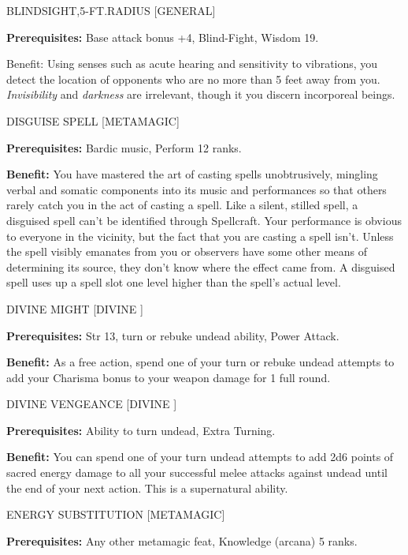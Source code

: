 \documentclass{article}
\begin{document}
\vspace{12pt}
BLINDSIGHT,5-FT.RADIUS [GENERAL]

\textbf{Prerequisites:} Base attack bonus +4, Blind-Fight, Wisdom 19.

Benefit: Using senses such as acute hearing and sensitivity to vibrations, you 
detect the location of opponents who are no more than 5 feet away from you. \textit{Invisibility 
}and \textit{darkness }are irrelevant, though it you discern incorporeal beings.

\vspace{12pt}
DISGUISE SPELL [METAMAGIC]

\textbf{Prerequisites:} Bardic music, Perform 12 ranks.

\textbf{Benefit:} You have mastered the art of casting spells unobtrusively, mingling 
verbal and somatic components into its music and performances so that others rarely 
catch you in the act of casting a spell. Like a silent, stilled spell, a disguised 
spell can't be identified through Spellcraft. Your performance is obvious to everyone 
in the vicinity, but the fact that you are casting a spell isn't. Unless the spell 
visibly emanates from you or observers have some other means of determining its 
source, they don't know where the effect came from. A disguised spell uses up a 
spell slot one level higher than the spell's actual level.

\vspace{12pt}
DIVINE MIGHT [DIVINE ]

\textbf{Prerequisites:} Str 13, turn or rebuke undead ability, Power Attack.

\textbf{Benefit:} As a free action, spend one of your turn or rebuke undead attempts 
to add your Charisma bonus to your weapon damage for 1 full round.

\vspace{12pt}
DIVINE VENGEANCE [DIVINE ]

\textbf{Prerequisites:} Ability to turn undead, Extra Turning.

\textbf{Benefit:} You can spend one of your turn undead attempts to add 2d6 points 
of sacred energy damage to all your successful melee attacks against undead until 
the end of your next action. This is a supernatural ability.

\vspace{12pt}
ENERGY SUBSTITUTION [METAMAGIC]

\textbf{Prerequisites:} Any other metamagic feat, Knowledge (arcana) 5 ranks.
\end{document}
